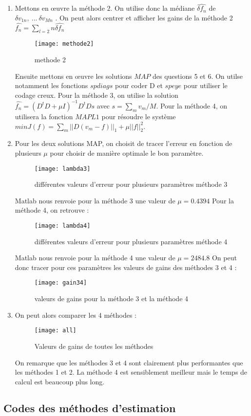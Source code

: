 \documentclass[12pt,a4paper,titlepage]{article}
\begin{document}
\begin{enumerate}
{	}
	\item{}Mettons en œuvre la méthode $2$. On utilise donc la médiane $\hat{\delta f_n}$ de $\delta v_{1n}, \ ...\ \delta v_{Mn}$ . On peut alors centrer et afficher les gains de la méthode 2 $\hat{f_n} = \sum_{l=2}n\hat{\delta f_n}$
	\begin{figure}[H]
    		\texttt{[image: methode2]}
		    		\centering
		\caption{methode 2}
	\end{figure}
	Ensuite mettons en œuvre les solutions $MAP$ des questions 5 et 6. On utilse notamment les fonctions $spdiags$ pour coder D et $speye$ pour utiliser le codage creux. Pour la méthode $3$, on utilise la solution $\hat{f_n}=(D^tD+\mu I)^{-1}D^tDs$ avec $s=\sum_m v_m/M$. Pour la méthode 4, on utilisera la fonction $MAPL1$ pour résoudre le système $min J(f) = \sum_m ||D(v_m-f)||_1+ \mu || f||_2^2$.
	\item{Pour les deux solutions MAP, on choisit de tracer l'erreur en fonction de plusieurs $\mu$ pour choisir de manière optimale le bon paramètre.
	\begin{figure}[H]
    		\texttt{[image: lambda3]}
    		\centering
		\caption{différentes valeurs d'erreur pour plusieurs paramètres méthode 3}
	\end{figure}
	Matlab nous renvoie pour la méthode 3 une valeur de $\mu=0.4394$
	Pour la méthode 4, on retrouve :
	\begin{figure}[H]
    		\texttt{[image: lambda4]}
    		\centering
		\caption{différentes valeurs d'erreur pour plusieurs paramètres méthode 4}
	\end{figure}
	Matlab nous renvoie pour la méthode 4 une valeur de $\mu=2484.8$
	On peut donc tracer pour ces paramètres les valeurs de gains des méthodes 3 et 4 :
	\begin{figure}[H]
    		\texttt{[image: gain34]}
    		\centering
		\caption{valeurs de gains pour la méthode 3 et la méthode 4}
	\end{figure}
	}
	\item{On peut alors comparer les 4 méthodes :
	\begin{figure}[H]
    		\texttt{[image: all]}
    		\centering
		\caption{Valeurs de gains de toutes les méthodes }
	\end{figure}
	On remarque que les méthodes 3 et 4 sont clairement plus performantes que les méthodes 1 et 2. La méthode 4 est sensiblement meilleur mais le temps de calcul est beaucoup plus long.
	}
\end{enumerate}

\pagebreak

\begin{appendices}
  \section{Codes des méthodes d'estimation}
    
\end{appendices}
\end{document}
